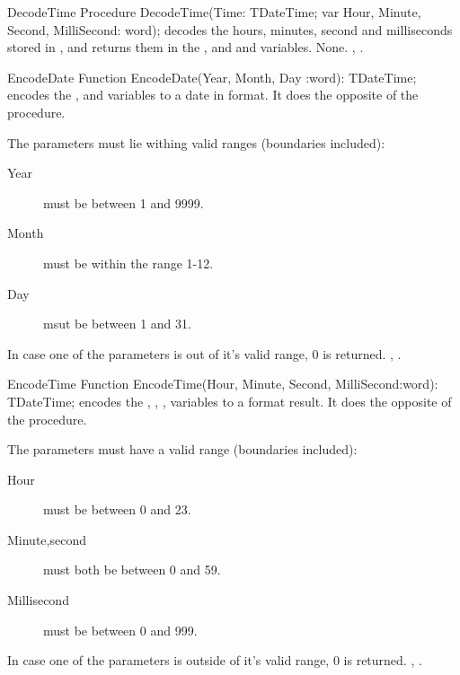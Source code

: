 

 
\begin{procedure}{DecodeTime}
\Declaration
Procedure DecodeTime(Time: TDateTime; var Hour, Minute, Second, MilliSecond: word);
\Description
{} decodes the hours, minutes, second and milliseconds stored 
in , and returns them in the ,  and
 and  variables.
\Errors
None.
\SeeAlso
{}, .
\end{procedure}


 
\begin{function}{EncodeDate}
\Declaration
Function EncodeDate(Year, Month, Day :word): TDateTime;
\Description
{} encodes the ,  and  variables to 
a date in  format. It does the opposite of the
 procedure.

The parameters must lie withing valid ranges (boundaries included):
\begin{description}
\item[Year] must be between 1 and 9999.
\item[Month] must be within the range 1-12.
\item[Day] msut be between 1 and 31.
\end{description}
\Errors
In case one of the parameters is out of it's valid range, 0 is returned.
\SeeAlso
{}, .
\end{function}



\begin{function}{EncodeTime}
\Declaration
Function EncodeTime(Hour, Minute, Second, MilliSecond:word): TDateTime;
\Description
{} encodes the , , ,
 variables to a  format result.
It does the opposite of the  procedure.

The parameters must have a valid range (boundaries included):
\begin{description}
\item[Hour] must be between 0 and 23.
\item[Minute,second] must both be between 0 and 59.
\item[Millisecond] must be between 0 and 999.
\end{description}
\Errors
In case one of the parameters is outside of it's valid range, 0 is returned.
\SeeAlso
{}, .
\end{function}

